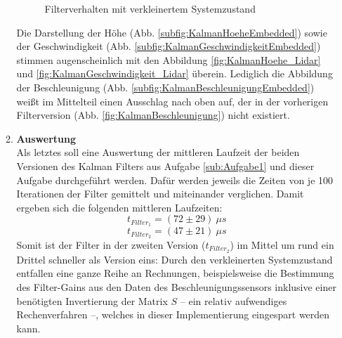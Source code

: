 \documentclass[12pt,a4paper]{article}
\begin{document}
\begin{enumerate}[label=\textbf{\arabic*})]
\begin{enumerate}[label=\textbf{\alph*})]
\begin{figure}[!ht]
		\newline
		\centering
		\caption{Filterverhalten mit verkleinertem Systemzustand}
		\label{fig:FilterAufgabe2_VerkleinertAbbildungen}
	\end{figure}
	Die Darstellung der Höhe (Abb. \ref{subfig:KalmanHoeheEmbedded}) sowie der Geschwindigkeit (Abb. \ref{subfig:KalmanGeschwindigkeitEmbedded}) stimmen augenscheinlich mit den Abbildung \ref{fig:KalmanHoehe_Lidar} und \ref{fig:KalmanGeschwindigkeit_Lidar} überein. Lediglich die Abbildung der Beschleunigung (Abb. \ref{subfig:KalmanBeschleunigungEmbedded}) weißt im Mittelteil einen Ausschlag nach oben auf, der in der vorherigen Filterversion (Abb. \ref{fig:KalmanBeschleunigung}) nicht existiert.\\
	
	\item \textbf{Auswertung}\label{subfig:AuswertungAufgabe2}\\
	
	Als letztes soll eine Auswertung der mittleren Laufzeit der beiden Versionen des Kalman Filters aus Aufgabe \ref{sub:Aufgabe1} und dieser Aufgabe durchgeführt werden. Dafür werden jeweils die Zeiten von je 100 Iterationen der Filter gemittelt und miteinander verglichen. Damit ergeben sich die folgenden mittleren Laufzeiten:
	\begin{equation}
			t_{Filter_{1}}=(72\pm 29)~\mu s
	\end{equation}
	\begin{equation}
			t_{Filter_{2}}=(47\pm 21)~\mu s
	\end{equation}
	Somit ist der Filter in der zweiten Version ($t_{Filter_{2}}$) im Mittel um rund ein Drittel schneller als Version eins: Durch den verkleinerten Systemzustand entfallen eine ganze Reihe an Rechnungen, beispielsweise die Bestimmung des Filter-Gains aus den Daten des Beschleunigungssensors inklusive einer benötigten Invertierung der Matrix $S$ -- ein relativ aufwendiges Rechenverfahren --, welches in dieser Implementierung eingespart werden kann.
	\end{enumerate}
	\end{enumerate}
\end{document}
